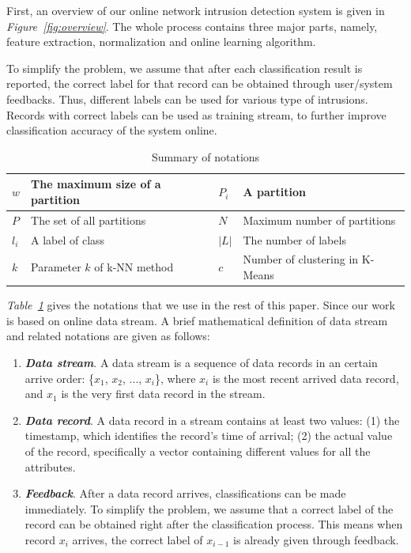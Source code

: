 \documentclass[runningheads]{llncs}
\begin{document}
	First, an overview of our online network intrusion detection system is given in \textit{Figure~\ref{fig:overview}}. The whole process contains three major parts, namely, feature extraction, normalization and online learning algorithm.
	
	To simplify the problem, we assume that after each classification result is reported, the correct label for that record can be obtained through user/system feedbacks. Thus, different labels can be used for various type of intrusions. Records with correct labels can be used as training stream, to further improve classification accuracy of the system online.
	
	\begin{table}
		\centering
		\caption{Summary of notations}\label{table:notation}
		\begin{tabular}{|m{2em}|m{15em}|m{2em}|m{15em}|}
			\hline
			$w$ & The maximum size of a partition & $P_i$ & A partition \\ 
			\hline
			$P$ & The set of all partitions & $N$ & Maximum number of partitions \\ 
			\hline
			$l_i$ & A label of class & $|L|$ & The number of labels  \\ 
			\hline
			$k$ & Parameter $k$ of k-NN method & $c$ & Number of clustering in K-Means \\
			\hline
		\end{tabular}
	\end{table}
	
	\textit{Table~\ref{table:notation}} gives the notations that we use in the rest of this paper. Since our work is based on online data stream. A brief mathematical definition of data stream and related notations are given as follows:
	
	\begin{enumerate}
		\item \textbf{\textit{Data stream}}. A data stream is a sequence of data records in an certain arrive order: \big\{$x_1$, $x_2$, ..., $x_i$\big\}, where $x_i$ is the most recent arrived data record, and $x_1$ is the very first data record in the stream.
		\item \textbf{\textit{Data record}}. A data record in a stream contains at least two values: (1) the timestamp, which identifies the record's time of arrival; (2) the actual value of the record, specifically a vector containing different values for all the attributes.
		\item \textbf{\textit{Feedback}}. After a data record arrives, classifications can be made immediately. To simplify the problem, we assume that a correct label of the record can be obtained right after the classification process. This means when record $x_i$ arrives, the correct label of $x_{i-1}$ is already given through feedback.
	\end{enumerate}
	
\end{document}
